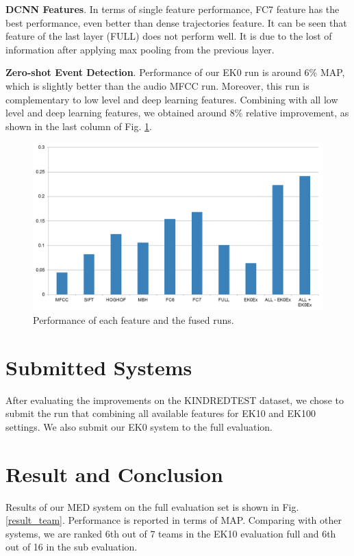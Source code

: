 \textbf{DCNN Features}. In terms of single feature performance, FC7 feature has the best performance, even better than dense trajectories feature. It can be seen that feature of the last layer (FULL) does not perform well. It is due to the lost of information after applying max pooling from the previous layer.

\textbf{Zero-shot Event Detection}. Performance of our EK0 run is around 6\% MAP, which is slightly better than the audio MFCC run. Moreover, this run is complementary to low level and deep learning features. Combining with all low level and deep learning features, we obtained around 8\% relative improvement, as shown in the last column of Fig. \ref{fig_feat_perf}.

\begin{figure}
	\centering
	\includegraphics[width=1\textwidth]{feat_perf.png}
	\caption{Performance of each feature and the fused runs.}
	\label{fig_feat_perf}
\end{figure}

\section{Submitted Systems}

After evaluating the improvements on the KINDREDTEST dataset, we chose to submit the run that combining all available features for EK10 and EK100 settings. We also submit our EK0 system to the full evaluation.

\section{Result and Conclusion}

Results of our MED system on the full evaluation set is shown in Fig. \ref{result_team}. Performance is reported in terms of MAP. Comparing with other systems, we are ranked 6th out of 7 teams in the EK10 evaluation full and 6th out of 16 in the sub evaluation. 

